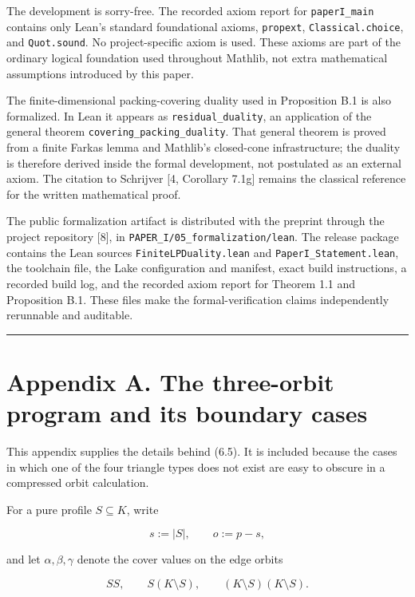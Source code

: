 \documentclass[
  11pt,
]{article}
\begin{document}
The development is sorry-free. The recorded axiom report for
\texttt{paperI\_main} contains only Lean's standard foundational axioms,
\texttt{propext}, \texttt{Classical.choice}, and \texttt{Quot.sound}. No
project-specific axiom is used. These axioms are part of the ordinary
logical foundation used throughout Mathlib, not extra mathematical
assumptions introduced by this paper.

The finite-dimensional packing-covering duality used in Proposition B.1
is also formalized. In Lean it appears as \texttt{residual\_duality}, an
application of the general theorem \texttt{covering\_packing\_duality}.
That general theorem is proved from a finite Farkas lemma and Mathlib's
closed-cone infrastructure; the duality is therefore derived inside the
formal development, not postulated as an external axiom. The citation to
Schrijver {[}4, Corollary 7.1g{]} remains the classical reference for
the written mathematical proof.

The public formalization artifact is distributed with the preprint
through the project repository {[}8{]}, in
\texttt{PAPER\_I/05\_formalization/lean}. The release package contains
the Lean sources \texttt{FiniteLPDuality.lean} and
\texttt{PaperI\_Statement.lean}, the toolchain file, the Lake
configuration and manifest, exact build instructions, a recorded build
log, and the recorded axiom report for Theorem 1.1 and Proposition B.1.
These files make the formal-verification claims independently rerunnable
and auditable.

\begin{center}\rule{0.5\linewidth}{0.5pt}\end{center}

\section{Appendix A. The three-orbit program and its boundary
cases}\label{appendix-a.-the-three-orbit-program-and-its-boundary-cases}

This appendix supplies the details behind (6.5). It is included because
the cases in which one of the four triangle types does not exist are
easy to obscure in a compressed orbit calculation.

For a pure profile \(S\subseteq K\), write

\[
s:=|S|,
\qquad
o:=p-s,
\]

and let \(\alpha,\beta,\gamma\) denote the cover values on the edge
orbits

\[
SS,\qquad S(K\setminus S),\qquad (K\setminus S)(K\setminus S).
\]
\end{document}
